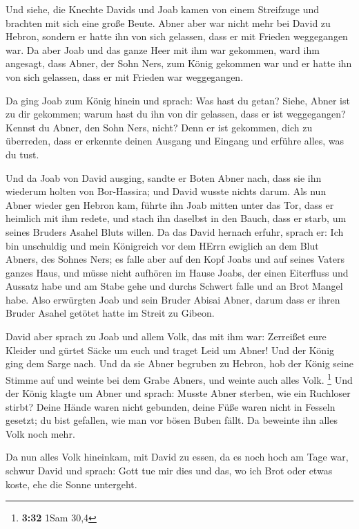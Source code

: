  Und siehe, die Knechte Davids und Joab kamen von einem
Streifzuge und brachten mit sich eine große Beute. Abner aber war nicht
mehr bei David zu Hebron, sondern er hatte ihn von sich gelassen, dass
er mit Frieden weggegangen war.  Da aber Joab und das ganze
Heer mit ihm war gekommen, ward ihm angesagt, dass Abner, der Sohn Ners,
zum König gekommen war und er hatte ihn von sich gelassen, dass er mit
Frieden war weggegangen.

 Da ging Joab zum König hinein und sprach: Was hast du
getan? Siehe, Abner ist zu dir gekommen; warum hast du ihn von dir
gelassen, dass er ist weggegangen?  Kennst du Abner, den
Sohn Ners, nicht? Denn er ist gekommen, dich zu überreden, dass er
erkennte deinen Ausgang und Eingang und erführe alles, was du tust.

 Und da Joab von David ausging, sandte er Boten Abner nach,
dass sie ihn wiederum holten von Bor-Hassira; und David wusste nichts
darum.  Als nun Abner wieder gen Hebron kam, führte ihn
Joab mitten unter das Tor, dass er heimlich mit ihm redete, und stach
ihn daselbst in den Bauch, dass er starb, um seines Bruders Asahel Bluts
willen.  Da das David hernach erfuhr, sprach er: Ich bin
unschuldig und mein Königreich vor dem HErrn ewiglich an dem Blut
Abners, des Sohnes Ners;  es falle aber auf den Kopf Joabs
und auf seines Vaters ganzes Haus, und müsse nicht aufhören im Hause
Joabs, der einen Eiterfluss und Aussatz habe und am Stabe gehe und
durchs Schwert falle und an Brot Mangel habe.  Also
erwürgten Joab und sein Bruder Abisai Abner, darum dass er ihren Bruder
Asahel getötet hatte im Streit zu Gibeon.

 David aber sprach zu Joab und allem Volk, das mit ihm war:
Zerreißet eure Kleider und gürtet Säcke um euch und traget Leid um
Abner! Und der König ging dem Sarge nach.  Und da sie Abner
begruben zu Hebron, hob der König seine Stimme auf und weinte bei dem
Grabe Abners, und weinte auch alles Volk. \footnote{\textbf{3:32} 1Sam
  30,4}  Und der König klagte um Abner und sprach: Musste
Abner sterben, wie ein Ruchloser stirbt?  Deine Hände waren
nicht gebunden, deine Füße waren nicht in Fesseln gesetzt; du bist
gefallen, wie man vor bösen Buben fällt. Da beweinte ihn alles Volk noch
mehr.

 Da nun alles Volk hineinkam, mit David zu essen, da es
noch hoch am Tage war, schwur David und sprach: Gott tue mir dies und
das, wo ich Brot oder etwas koste, ehe die Sonne untergeht.

